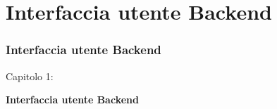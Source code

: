 %

\section{Interfaccia utente Backend}
\begin{frame}[fragile]
	\frametitle{Interfaccia utente Backend}

	\begin{center}\huge{Capitolo 1:}\end{center}
	\begin{center}\huge{\color{typo3darkgrey}\textbf{Interfaccia utente Backend}}\end{center}

\end{frame}

